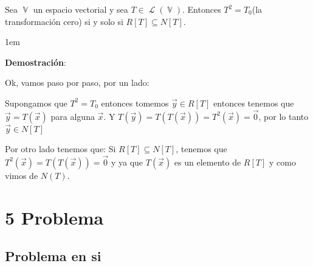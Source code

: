 \documentclass[12pt, fleqn]{article}                             %
\newenvironment{SmallIndentation}[1][0.75em]                    %
        {\begin{adjustwidth}{#1}{}\begin{footnotesize}}             %
        {\end{footnotesize}\end{adjustwidth}}                       %
\theoremstyle{break}                                            %
\DeclareMathOperator \VectorSet    {\mathbb{V}}                 %
\DeclareMathOperator \LinTrans {\mathcal{T}}                    %
\DeclareMathOperator \Laplace {\mathcal{L}}                     %
\begin{document}
    Sea $\VectorSet$ un espacio vectorial y sea $T \in \Laplace(\VectorSet)$. Entonces 
    $T^2 = T_0$(la transformación cero) si y solo si $R[T] \subseteq N[T]$.

    \begin{SmallIndentation}[1em]
        \textbf{Demostración}:
        
        Ok, vamos paso por paso, por un lado:

        Supongamos que $T^2 = T_0$ entonces tomemos $\vec y \in R[T]$ entonces 
        tenemos que $\vec y = T(\vec x)$ para alguna $\vec x$.
        Y $T(\vec y) = T(T(\vec x)) = T^2(\vec x) = \vec 0$, por lo tanto $\vec y \in N[T]$

        Por otro lado tenemos que:
        Si $R[T] \subseteq N[T]$, tenemos que $T^2(\vec x) = T(T(\vec x)) = \vec 0$ 
        y ya que $T(\vec x)$ es un elemento de $R[T]$ y como vimos de $N(T)$.
    
    \end{SmallIndentation}




\clearpage
\section{5 Problema}


    \clearpage
    \subsection{Problema en si}
\end{document}
